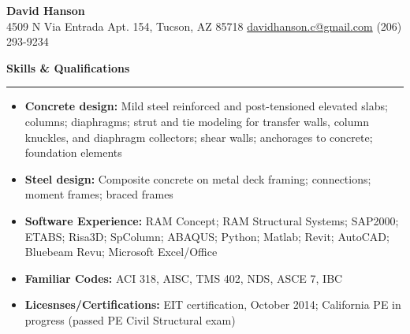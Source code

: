 \documentclass[letterpaper,6pt]{article}
\begin{document}
\begin{center}
{\Large \textbf{David Hanson}}\\
    4509 N Via Entrada Apt. 154, Tucson, AZ 85718 \textbar{}
         \href{mailto:davidhanson.c@gmail.com}{davidhanson.c@gmail.com} \textbar{} 
         (206) 293-9234
\end{center}

{\large \textbf{Skills \& Qualifications}}
\hrule
\vspace{2mm}
\begin{itemize}[noitemsep,topsep=0pt]
    \item  \textbf{Concrete design:} Mild steel reinforced and post-tensioned elevated slabs; columns; diaphragms; strut and tie modeling for transfer walls, column knuckles, and diaphragm collectors; shear walls; anchorages to concrete; foundation elements
    \item  \textbf{Steel design:} Composite concrete on metal deck framing; connections; moment frames; braced frames
    \item  \textbf{Software Experience:} RAM Concept; RAM Structural Systems; SAP2000; ETABS; Risa3D; SpColumn; ABAQUS; Python; Matlab; Revit; AutoCAD; Bluebeam Revu; Microsoft Excel/Office
    \item  \textbf{Familiar Codes:} ACI 318, AISC, TMS 402, NDS, ASCE 7, IBC
    \item  \textbf{Licesnses/Certifications:} EIT certification, October 2014;
      California PE in progress (passed PE Civil Structural exam)
\end{itemize}
\vspace{5mm}
\end{document}
